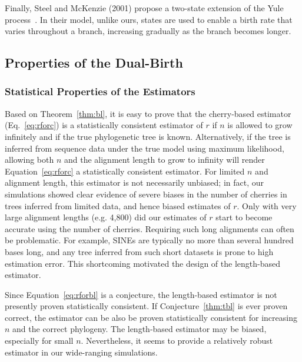 Finally, Steel and McKenzie (2001) propose a two-state extension of the Yule process~\cite{Steel2001}. In their model, unlike ours, states are used to enable a birth rate that varies throughout a branch, increasing gradually as the branch becomes longer.

\subsection{Properties of the Dual-Birth}
\subsubsection{Statistical Properties of the Estimators}\label{sec:dualbirth-estimator-properties}
Based on Theorem~\ref{thm:bl}, it is easy to prove that the cherry-based estimator (Eq.~\ref{eq:rforc}) is a statistically consistent estimator of $r$ if $n$ is allowed to grow infinitely and if the true phylogenetic tree is known. Alternatively, if the tree is inferred from sequence data under the true model using maximum likelihood, allowing both $n$ and the alignment length to grow to infinity will render Equation~\ref{eq:rforc} a statistically consistent estimator. For limited $n$ and alignment length, this estimator is not necessarily unbiased; in fact, our simulations showed clear evidence of severe biases in the number of cherries in trees inferred from limited data, and hence biased estimates of $r$. Only with very large alignment lengths (e.g. 4,800) did our estimates of $r$ start to become accurate using the number of cherries. Requiring such long alignments can often be problematic. For example, \glspl{SINE} are typically no more than several hundred bases long, and any tree inferred from such short datasets is prone to high estimation error. This shortcoming motivated the design of the length-based estimator.

Since Equation~\ref{eq:rforbl} is a conjecture, the length-based estimator is not presently proven statistically consistent. If Conjecture~\ref{thm:tbl} is ever proven correct, the estimator can be also be proven statistically consistent for increasing $n$ and the correct phylogeny. The length-based estimator may be biased, especially for small $n$. Nevertheless, it seems to provide a relatively robust estimator in our wide-ranging simulations.

